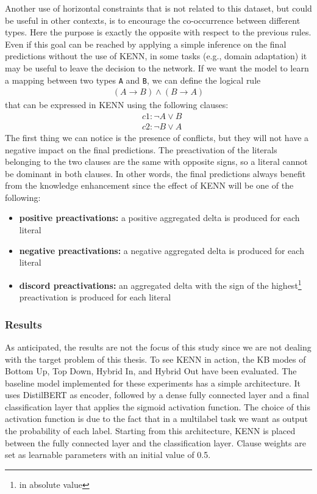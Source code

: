 Another use of horizontal constraints that is not related to this dataset, but could be useful in other contexts, is to encourage the co-occurrence between different types. Here the purpose is exactly the opposite with respect to the previous rules. Even if this goal can be reached by applying a simple inference on the final predictions without the use of KENN, in some tasks (e.g., domain adaptation) it may be useful to leave the decision to the network. If we want the model to learn a mapping between two types \texttt{A} and \texttt{B}, we can define the logical rule
\begin{gather*}
    (A \to B) \wedge (B \to A)
\end{gather*}
that can be expressed in KENN using the following clauses:
\begin{align*}
    & c1: \neg A \vee B \\
    & c2: \neg B \vee A
\end{align*}
The first thing we can notice is the presence of conflicts, but they will not have a negative impact on the final predictions. The preactivation of the literals belonging to the two clauses are the same with opposite signs, so a  literal cannot be dominant in both clauses. In other words, the final predictions always benefit from the knowledge enhancement since the effect of KENN will be one of the following:
\begin{itemize}
    \item \textbf{positive preactivations:} a positive aggregated delta is produced for each literal
    \item \textbf{negative preactivations:} a negative aggregated delta is produced for each literal
    \item \textbf{discord preactivations:} an aggregated delta with the sign of the highest\footnote{in absolute value} preactivation is produced for each literal
\end{itemize}


\subsubsection{Results}
As anticipated, the results are not the focus of this study since we are not dealing with the target problem of this thesis. To see KENN in action, the KB modes of Bottom Up, Top Down, Hybrid In, and Hybrid Out have been evaluated. 
The baseline model implemented for these experiments has a simple architecture. It uses DistilBERT as encoder, followed by a dense fully connected layer and a final classification layer that applies the sigmoid activation function. The choice of this activation function is due to the fact that in a multilabel task we want as output the probability of each label. Starting from this architecture, KENN is placed between the fully connected layer and the classification layer. Clause weights are set as learnable parameters with an initial value of 0.5.


